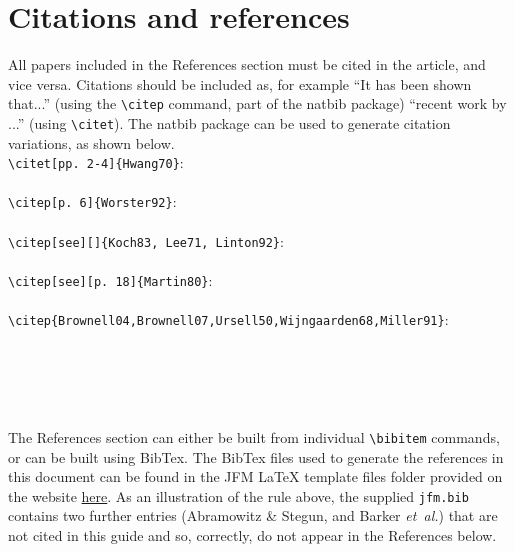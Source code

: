 \documentclass[lineno]{JFM-FLM_Au}
\begin{document}
%
% 
% 



\section{Citations and references}

All papers included in the References section must be cited in the article, and vice versa. Citations should be included as, for example ``It has been shown \citep{Rogallo81} that...'' (using the {\verb}\citep}} command, part of the natbib package) ``recent work by \citet{Dennis85}...'' (using {\verb}\citet}}).
The natbib package can be used to generate citation variations, as shown below.\\
\verb#\citet[pp. 2-4]{Hwang70}#:\\
\citet[pp. 2-4]{Hwang70} \\
\verb#\citep[p. 6]{Worster92}#:\\
\citep[p. 6]{Worster92}\\
\verb#\citep[see][]{Koch83, Lee71, Linton92}#:\\
\citep[see][]{Koch83, Lee71, Linton92}\\
\verb#\citep[see][p. 18]{Martin80}#:\\
\citep[see][p. 18]{Martin80}\\
\verb#\citep{Brownell04,Brownell07,Ursell50,Wijngaarden68,Miller91}#:\\
\citep{Brownell04,Brownell07,Ursell50,Wijngaarden68,Miller91}\\
\citet{EdwardsVirouletKokelaarGray2017}\\
\citep{Briukhanovetal1967}\\
\cite{Bouguet01}\\
\citep{JosephSaut1990}\\

The References section can either be built from individual \verb#\bibitem# commands, or can be built using BibTex. The BibTex files used to generate the references in this document can be found in the JFM {\LaTeX} template files folder provided on the website \href{https://www.cambridge.org/core/journals/journal-of-fluid-mechanics/information/author-instructions/preparing-your-materials}{here}. As an illustration of the rule above, the supplied \texttt{jfm.bib} contains two further entries (Abramowitz \& Stegun, and Barker \textit{et~al.}) that are not cited in this guide and so, correctly, do not appear in the References below.
\end{document}
